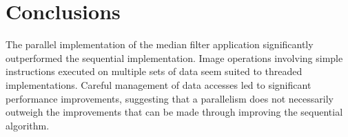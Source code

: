 \section{Conclusions}
The parallel implementation of the median filter application significantly outperformed the sequential implementation. Image operations involving simple instructions executed on multiple sets of data seem suited to threaded implementations. Careful management of data accesses led to significant performance improvements, suggesting that a parallelism does not necessarily outweigh the improvements that can be made through improving the sequential algorithm.